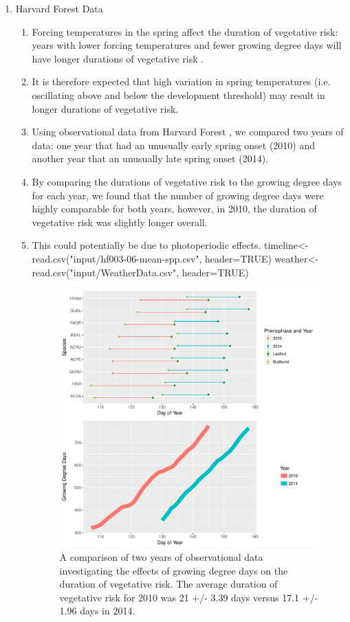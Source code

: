 \documentclass{article}\usepackage[]{graphicx}\usepackage[]{color}
\begin{document}
\begin{enumerate}
\item Harvard Forest Data
\begin{enumerate}
\item Forcing temperatures in the spring affect the duration of vegetative risk: years with lower forcing temperatures and fewer growing degree days will have longer durations of vegetative risk \citep{Donnelly2017}.
\item It is therefore expected that high variation in spring temperatures (i.e. oscillating above and below the development threshold) may result in longer durations of vegetative risk.
\item Using observational data from Harvard Forest \citep{Okeefe2014}, we compared two years of data: one year that had an unusually early spring onset (2010) and another year that an unusually late spring onset (2014).
\item By comparing the durations of vegetative risk to the growing degree days for each year, we found that the number of growing degree days were highly comparable for both years, however, in 2010, the duration of vegetative risk was slightly longer overall. 
\item This could potentially be due to photoperiodic effects. 
timeline<-read.csv("input/hf003-06-mean-spp.csv", header=TRUE)
weather<-read.csv("input/WeatherData.csv", header=TRUE)

\begin{figure} [H] \label{hf}
\begin{center}
\caption{A comparison of two years of observational data investigating the effects of growing degree days on the duration of vegetative risk. The average duration of vegetative risk for 2010 was 21 +/- 3.39 days versus 17.1 +/- 1.96 days in 2014.}
\includegraphics{..//figure/HF_gddTime.pdf}
\end{center}
\end{figure}


\end{enumerate}
\end{enumerate}
\end{document}
